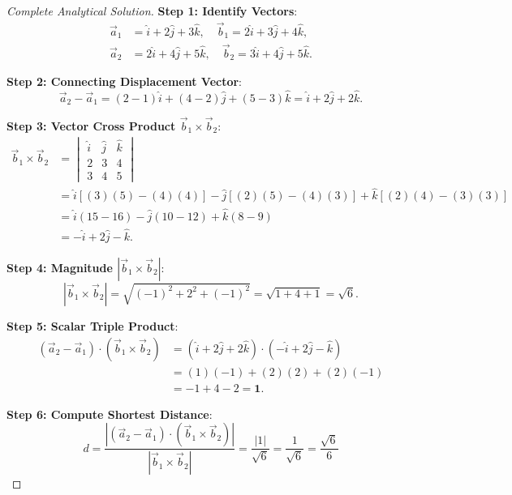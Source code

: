 \begin{proof}[Complete Analytical Solution]
\textbf{Step 1: Identify Vectors}:
\begin{align}
    \vec{a}_1 &= \hat{i} + 2\hat{j} + 3\hat{k}, \quad \vec{b}_1 = 2\hat{i} + 3\hat{j} + 4\hat{k}, \\
    \vec{a}_2 &= 2\hat{i} + 4\hat{j} + 5\hat{k}, \quad \vec{b}_2 = 3\hat{i} + 4\hat{j} + 5\hat{k}.
\end{align}

\textbf{Step 2: Connecting Displacement Vector}:
\begin{equation}
    \vec{a}_2 - \vec{a}_1 = (2 - 1)\hat{i} + (4 - 2)\hat{j} + (5 - 3)\hat{k} = \hat{i} + 2\hat{j} + 2\hat{k}.
\end{equation}

\textbf{Step 3: Vector Cross Product $\vec{b}_1 \times \vec{b}_2$}:
\begin{align}
    \vec{b}_1 \times \vec{b}_2 &= \begin{vmatrix}
    \hat{i} & \hat{j} & \hat{k} \\
    2 & 3 & 4 \\
    3 & 4 & 5
    \end{vmatrix} \nonumber\\
    &= \hat{i}[(3)(5) - (4)(4)] - \hat{j}[(2)(5) - (4)(3)] + \hat{k}[(2)(4) - (3)(3)] \nonumber\\
    &= \hat{i}(15 - 16) - \hat{j}(10 - 12) + \hat{k}(8 - 9) \nonumber\\
    &= -\hat{i} + 2\hat{j} - \hat{k}.
\end{align}

\textbf{Step 4: Magnitude $|\vec{b}_1 \times \vec{b}_2|$}:
\begin{equation}
    |\vec{b}_1 \times \vec{b}_2| = \sqrt{(-1)^2 + 2^2 + (-1)^2} = \sqrt{1 + 4 + 1} = \sqrt{6}.
\end{equation}

\textbf{Step 5: Scalar Triple Product}:
\begin{align}
    (\vec{a}_2 - \vec{a}_1) \cdot (\vec{b}_1 \times \vec{b}_2) &= (\hat{i} + 2\hat{j} + 2\hat{k}) \cdot (-\hat{i} + 2\hat{j} - \hat{k}) \nonumber\\
    &= (1)(-1) + (2)(2) + (2)(-1) \nonumber\\
    &= -1 + 4 - 2 = \mathbf{1}.
\end{align}

\textbf{Step 6: Compute Shortest Distance}:
\begin{equation}
    \boxed{d = \frac{|(\vec{a}_2 - \vec{a}_1) \cdot (\vec{b}_1 \times \vec{b}_2)|}{|\vec{b}_1 \times \vec{b}_2|} = \frac{|1|}{\sqrt{6}} = \frac{1}{\sqrt{6}} = \frac{\sqrt{6}}{6}}
\end{equation}
\end{proof}
